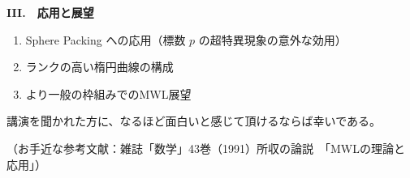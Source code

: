 \documentclass[uplatex,dvipdfmx]{jlreq}
\begin{document}
\bigskip

\noindent\textbf{III\@.　応用と展望}
\begin{enumerate}
  \setlength{\itemsep}{0pt}
  \item Sphere Packing への応用（標数 $p$ の超特異現象の意外な効用）
  \item ランクの高い楕円曲線の構成
  \item より一般の枠組みでのMWL展望
\end{enumerate}

\bigskip\bigskip

講演を聞かれた方に、なるほど面白いと感じて頂けるならば幸いである。

\bigskip

\noindent
（お手近な参考文献：雑誌「数学」43巻（1991）所収の論説　「MWLの理論と応用」）
\end{document}
